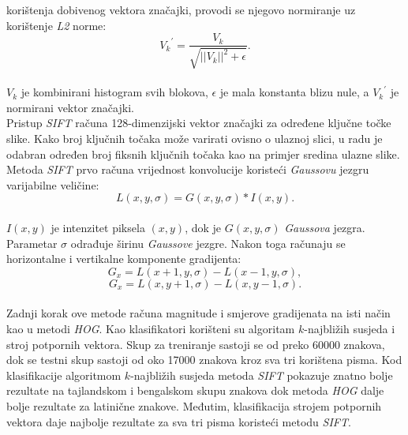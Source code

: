 korištenja dobivenog vektora značajki, provodi se njegovo normiranje uz korištenje \emph{L2} norme:\\
\begin{equation}
{V_k}^{'} = \frac{V_k}{\sqrt{{||V_k||}^2 + \epsilon}}.\label{eq:normalized-features}
\end{equation}
\\
$V_k$ je kombinirani histogram svih blokova, $\epsilon$ je mala konstanta blizu nule, a ${V_k}^{'}$ je normirani vektor
značajki.\\
Pristup \emph{SIFT} računa 128-dimenzijski vektor značajki za određene ključne točke slike. Kako broj ključnih točaka
može varirati ovisno o ulaznoj slici, u radu je odabran određen broj fiksnih ključnih točaka kao na primjer sredina
ulazne slike. Metoda \emph{SIFT} prvo računa vrijednost konvolucije koristeći \emph{Gaussovu} jezgru varijabilne
veličine:\\
\begin{equation}
    L(x, y, \sigma) = G(x, y, \sigma) * I(x, y).\label{eq:gauss-kernel}
\end{equation}
\\
$I(x, y)$ je intenzitet piksela $(x, y)$, dok je $G(x, y, \sigma)$ \emph{Gaussova} jezgra. Parametar $\sigma$ odrađuje
širinu \emph{Gaussove} jezgre. Nakon toga računaju se horizontalne i vertikalne komponente gradijenta:\\
\begin{equation}
    G_x = L(x + 1, y, \sigma) - L(x - 1, y, \sigma),\label{eq:gauss-grad-x}
\end{equation}
\begin{equation}
    G_x = L(x, y + 1, \sigma) - L(x, y - 1, \sigma).\label{eq:gauss-grad-y}
\end{equation}
\\
Zadnji korak ove metode računa magnitude i smjerove gradijenata na isti način kao u metodi \emph{HOG}. Kao
klasifikatori korišteni su algoritam $k$-najbližih susjeda i stroj potpornih vektora. Skup za treniranje sastoji se od
preko 60000 znakova, dok se testni skup sastoji od oko 17000 znakova kroz sva tri korištena pisma. Kod klasifikacije
algoritmom $k$-najbližih susjeda metoda \emph{SIFT} pokazuje znatno bolje rezultate na tajlandskom i bengalskom skupu
znakova dok metoda \emph{HOG} dalje bolje rezultate za latinične znakove. Međutim, klasifikacija strojem potpornih
vektora daje najbolje rezultate za sva tri pisma koristeći metodu \emph{SIFT}.

